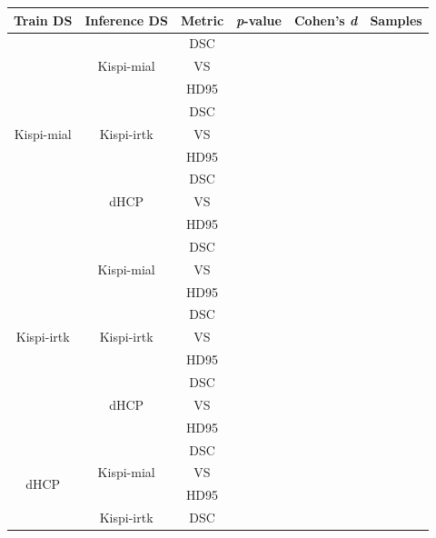 \begin{table}[htbp]
  \centering
  \begin{tabular}{c|c|c|c|c|c}
    \toprule
    \textbf{Train DS} & \textbf{Inference DS} & \textbf{Metric} & \textbf{\textit{p}-value} & \textbf{Cohen's \textit{d}} & \textbf{Samples} \\
    \midrule
    \multirow{9}{*}{Kispi-mial}
      & \multirow{3}{*}{Kispi-mial} & DSC  &  &  &  \\
      &                             & VS   &  &  &  \\
      &                             & HD95 &  &  &  \\
    \hhline{~-----}
      & \multirow{3}{*}{Kispi-irtk} & DSC  &  &  &  \\
      &                             & VS   &  &  &  \\
      &                             & HD95 &  &  &  \\
    \hhline{~-----}
      & \multirow{3}{*}{dHCP} & DSC  &  &  &  \\
      &                       & VS   &  &  &  \\
      &                       & HD95 &  &  &  \\
    \hline
    \multirow{9}{*}{Kispi-irtk}
      & \multirow{3}{*}{Kispi-mial} & DSC  &  &  &  \\
      &                             & VS   &  &  &  \\
      &                             & HD95 &  &  &  \\
    \hhline{~-----}
      & \multirow{3}{*}{Kispi-irtk} & DSC  &  &  &  \\
      &                             & VS   &  &  &  \\
      &                             & HD95 &  &  &  \\
    \hhline{~-----}
      & \multirow{3}{*}{dHCP} & DSC  &  &  &  \\
      &                       & VS   &  &  &  \\
      &                       & HD95 &  &  &  \\
    \hline
    \multirow{9}{*}{dHCP}
      & \multirow{3}{*}{Kispi-mial} & DSC  &  &  &  \\
      &                             & VS   &  &  &  \\
      &                             & HD95 &  &  &  \\
    \hhline{~-----}
      & \multirow{3}{*}{Kispi-irtk} & DSC  &  &  &  \\

\end{tabular}
\end{table}
